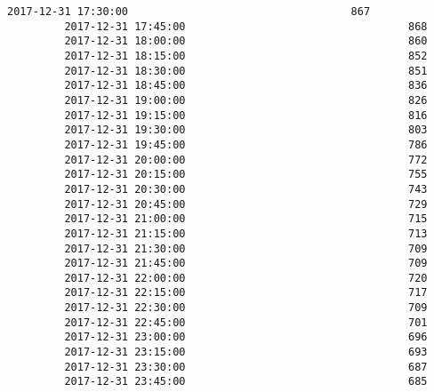 \documentclass[11pt]{article}
\begin{document}
\begin{Verbatim}[commandchars=\\\{\}]
         2017-12-31 17:30:00                                   867   
         2017-12-31 17:45:00                                   868   
         2017-12-31 18:00:00                                   860   
         2017-12-31 18:15:00                                   852   
         2017-12-31 18:30:00                                   851   
         2017-12-31 18:45:00                                   836   
         2017-12-31 19:00:00                                   826   
         2017-12-31 19:15:00                                   816   
         2017-12-31 19:30:00                                   803   
         2017-12-31 19:45:00                                   786   
         2017-12-31 20:00:00                                   772   
         2017-12-31 20:15:00                                   755   
         2017-12-31 20:30:00                                   743   
         2017-12-31 20:45:00                                   729   
         2017-12-31 21:00:00                                   715   
         2017-12-31 21:15:00                                   713   
         2017-12-31 21:30:00                                   709   
         2017-12-31 21:45:00                                   709   
         2017-12-31 22:00:00                                   720   
         2017-12-31 22:15:00                                   717   
         2017-12-31 22:30:00                                   709   
         2017-12-31 22:45:00                                   701   
         2017-12-31 23:00:00                                   696   
         2017-12-31 23:15:00                                   693   
         2017-12-31 23:30:00                                   687   
         2017-12-31 23:45:00                                   685   
         

\end{Verbatim}
\end{document}
